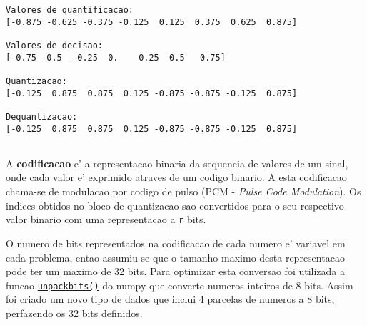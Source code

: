 \documentclass[11pt]{article}
\begin{document}
    \begin{Verbatim}[commandchars=\\\{\}]
Valores de quantificacao:
[-0.875 -0.625 -0.375 -0.125  0.125  0.375  0.625  0.875]

Valores de decisao:
[-0.75 -0.5  -0.25  0.    0.25  0.5   0.75]

Quantizacao:
[-0.125  0.875  0.875  0.125 -0.875 -0.875 -0.125  0.875]

Dequantizacao:
[-0.125  0.875  0.875  0.125 -0.875 -0.875 -0.125  0.875]


    \end{Verbatim}

    A \textbf{codificacao} e' a representacao binaria da sequencia de
valores de um sinal, onde cada valor e' exprimido atraves de um codigo
binario. A esta codificacao chama-se de modulacao por codigo de pulso
(PCM - \emph{Pulse Code Modulation}). Os indices obtidos no bloco de
quantizacao sao convertidos para o seu respectivo valor binario com uma
representacao a \texttt{r} bits.

O numero de bits representados na codificacao de cada numero e' variavel
em cada problema, entao assumiu-se que o tamanho maximo desta
representacao pode ter um maximo de 32 bits. Para optimizar esta
conversao foi utilizada a funcao
\href{https://docs.scipy.org/doc/numpy-1.13.0/reference/generated/numpy.unpackbits.html}{\texttt{unpackbits()}}
do numpy que converte numeros inteiros de 8 bits. Assim foi criado um
novo tipo de dados que inclui 4 parcelas de numeros a 8 bits, perfazendo
os 32 bits definidos.
\end{document}
